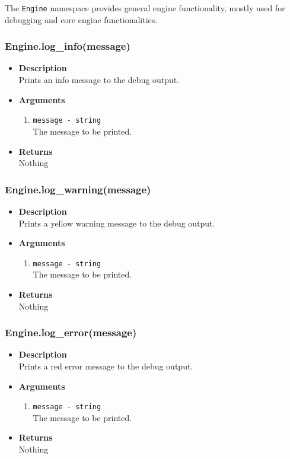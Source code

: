 \documentclass[12pt,a4paper]{article}
\begin{document}
The \texttt{Engine} namespace provides general engine functionality, mostly used for debugging and core engine functionalities.


\subsubsection{Engine.log\_info(message)}
\begin{itemize}
	\item[]{\bf Description}
		\\ Prints an info message to the debug output.
	\item[]{\bf Arguments}
	\begin{enumerate}
		\item{\texttt{message - string}} 
			\\ The message to be printed.
	\end{enumerate}
	\item[]{\bf Returns}
		\\ Nothing
\end{itemize}

\subsubsection{Engine.log\_warning(message)}
\begin{itemize}
	\item[]{\bf Description}
		\\ Prints a yellow warning message to the debug output.
	\item[]{\bf Arguments}
	\begin{enumerate}
		\item{\texttt{message - string}} 
			\\ The message to be printed.
	\end{enumerate}
	\item[]{\bf Returns}
		\\ Nothing
\end{itemize}

\subsubsection{Engine.log\_error(message)}
\begin{itemize}
	\item[]{\bf Description}
		\\ Prints a red error message to the debug output.
	\item[]{\bf Arguments}
	\begin{enumerate}
		\item{\texttt{message - string}} 
			\\ The message to be printed.
	\end{enumerate}
	\item[]{\bf Returns}
		\\ Nothing
\end{itemize}
\end{document}

